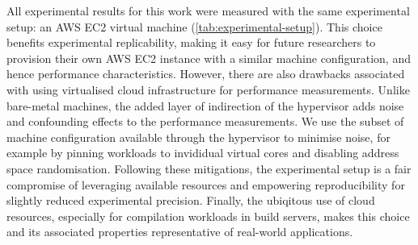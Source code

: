 All experimental results for this work were measured with the same experimental setup: an AWS EC2 virtual machine (\autoref{tab:experimental-setup}).
This choice benefits experimental replicability, making it easy for future researchers to provision their own AWS EC2 instance with a similar machine configuration, and hence performance characteristics.
However, there are also drawbacks associated with using virtualised cloud infrastructure for performance measurements.
Unlike bare-metal machines, the added layer of indirection of the hypervisor adds noise and confounding effects to the performance measurements.
We use the subset of machine configuration available through the hypervisor to minimise noise, for example by pinning workloads to invididual virtual cores and disabling address space randomisation. %
Following these mitigations, the experimental setup is a fair compromise of leveraging available resources and empowering reproducibility for slightly reduced experimental precision.
Finally, the ubiqitous use of cloud resources, especially for compilation workloads in build servers, makes this choice and its associated properties representative of real-world applications.


